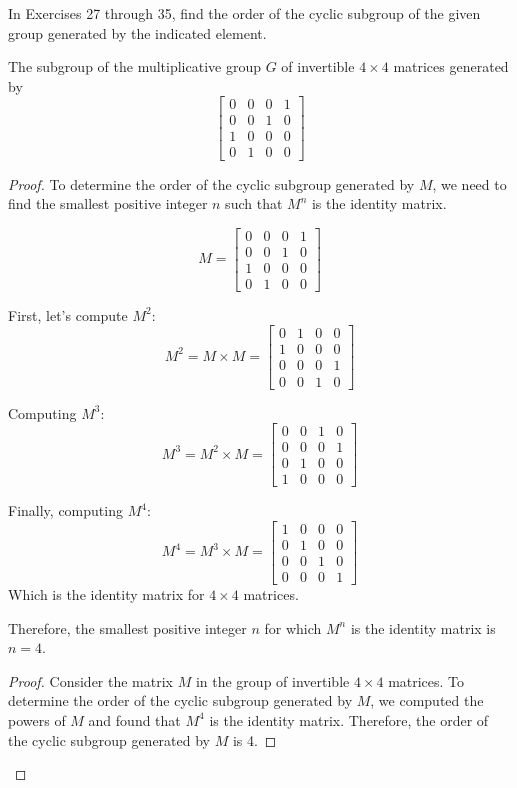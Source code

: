 \documentclass[12pt]{amsart}
\theoremstyle{definition}
\numberwithin{equation}{section}
\theoremstyle{plain}
\begin{document}
    \begin{exercise}{34} In Exercises 27 through 35, find the order of the cyclic subgroup of the given group generated by the indicated element.

        The subgroup of the multiplicative group $G$ of invertible $4 \times 4$ matrices generated by 
       \[\begin{bmatrix}
        0& 0& 0& 1\\[3pt]
        0& 0& 1& 0\\[3pt]
        1& 0& 0& 0\\[3pt]
        0& 1& 0& 0
       \end{bmatrix} \]
    \begin{proof}
To determine the order of the cyclic subgroup generated by \( M \), we need to find the smallest positive integer \( n \) such that \( M^n \) is the identity matrix.

\[
M = \begin{bmatrix}
        0& 0& 0& 1\\[3pt]
        0& 0& 1& 0\\[3pt]
        1& 0& 0& 0\\[3pt]
        0& 1& 0& 0
       \end{bmatrix}
\]

First, let's compute \( M^2 \):
\[
M^2 = M \times M = \begin{bmatrix}
        0& 1& 0& 0\\[3pt]
        1& 0& 0& 0\\[3pt]
        0& 0& 0& 1\\[3pt]
        0& 0& 1& 0
       \end{bmatrix}
\]

Computing \( M^3 \):
\[
M^3 = M^2 \times M = \begin{bmatrix}
        0& 0& 1& 0\\[3pt]
        0& 0& 0& 1\\[3pt]
        0& 1& 0& 0\\[3pt]
        1& 0& 0& 0
       \end{bmatrix}
\]

Finally, computing \( M^4 \):
\[
M^4 = M^3 \times M = \begin{bmatrix}
        1& 0& 0& 0\\[3pt]
        0& 1& 0& 0\\[3pt]
        0& 0& 1& 0\\[3pt]
        0& 0& 0& 1
       \end{bmatrix}
\]
Which is the identity matrix for \( 4 \times 4 \) matrices.

Therefore, the smallest positive integer \( n \) for which \( M^n \) is the identity matrix is \( n = 4 \).

\begin{proof}
Consider the matrix \( M \) in the group of invertible \( 4 \times 4 \) matrices. To determine the order of the cyclic subgroup generated by \( M \), we computed the powers of \( M \) and found that \( M^4 \) is the identity matrix. Therefore, the order of the cyclic subgroup generated by \( M \) is 4.
\end{proof}
    \end{proof}
    \end{exercise}
\end{document}
